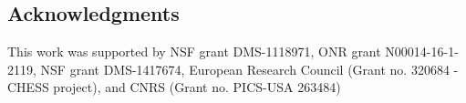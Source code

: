 \documentclass[a0,landscape]{a0poster}
\begin{document}
\begin{multicols}{4}


\section*{Acknowledgments}\label{sec:Acknowledgements}

This work was supported by NSF grant DMS-1118971, ONR grant N00014-16-1-2119,
NSF grant DMS-1417674, European Research Council (Grant no. 320684 - CHESS
project), and CNRS (Grant no. PICS-USA 263484)

\end{multicols}
\end{document}
